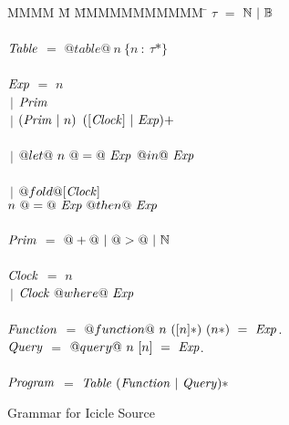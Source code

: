 
\begin{figure}

\begin{tabbing}
MMMM \= M \= MMMMMMMMMMM \= \kill
$\tau$          \> $=$  \> $\mathbb{N}~|~\mathbb{B}$ \\
\\
$\mathit{Table}$    \> $=$  \> $@table@~n~\{n~:~\tau*\}$ \\
\\
$\mathit{Exp}$
    \> $=$  \> $n$          \\
    \> $~|$ \> $\mathit{Prim}$     \\
    \> $~|$ \> $(\mathit{Prim}~|~n)$     \> $([\mathit{Clock}]~|~\mathit{Exp})+$ \\
\\
    \> $~|$ \> $@let@~n~@=@~\mathit{Exp}$
            \> $@in@~\mathit{Exp}$ \\
                \\
    \> $~|$ \> $@fold@[\mathit{Clock}]$ \\
    \>      \> $n~@=@~\mathit{Exp}~@then@~\mathit{Exp}$
\\
\\
$\mathit{Prim}$
    \> $=$  \> $@+@~|~@>@~|~\mathbb{N}$ \\
\\
$\mathit{Clock}$
    \> $=$  \> $n$          \\
    \> $~|$ \> $\mathit{Clock}~@where@~\mathit{Exp}$          \\
\\
$\mathit{Function}$
    \> $=$  \> $@function@~n~([n]*)~(n*)~=~\mathit{Exp}$.          \\

$\mathit{Query}$
    \> $=$  \> $@query@~n~[n]~=~\mathit{Exp}$.          \\
\\
$\mathit{Program}$
    \> $=$  \> $\mathit{Table}~(\mathit{Function}~|~\mathit{Query})*$ \\
\end{tabbing}


\caption{Grammar for Icicle Source}
\label{fig:source:grammar}
\end{figure}

